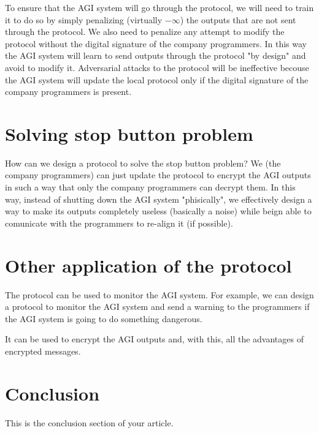 \documentclass{article}
\begin{document}
To ensure that the AGI system will go through the protocol, we will need to train it to do so by simply penalizing (virtually $-\infty$) the outputs that are not sent through the protocol.
We also need to penalize any attempt to modify the protocol without the digital signature of the company programmers.
In this way the AGI system will learn to send outputs through the protocol "by design" and avoid to modify it.
Adversarial attacks to the protocol will be ineffective becouse the AGI system will update the local protocol only if the digital signature of the company programmers is present.

\section{Solving stop button problem}
How can we design a protocol to solve the stop button problem?
We (the company programmers) can just update the protocol to encrypt the AGI outputs in such a way that only the company programmers can decrypt them.
In this way, instead of shutting down the AGI system "phisically", we effectively design a way to make its outputs completely useless (basically a noise) 
while beign able to comunicate with the programmers to re-align it (if possible).

\section{Other application of the protocol}
The protocol can be used to monitor the AGI system.
For example, we can design a protocol to monitor the AGI system and send a warning to the programmers if the AGI system is going to do something dangerous.

It can be used to encrypt the AGI outputs and, with this, all the advantages of encrypted messages.

\section{Conclusion}
This is the conclusion section of your article.

\begin{thebibliography}{9}

\end{thebibliography}
\end{document}
